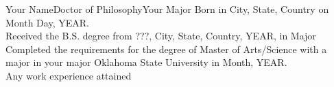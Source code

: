 \newpage
 \begin{vita}{Your Name}{Doctor of Philosophy}{Your Major} %
  Born in City, State, Country on Month Day, YEAR.             
  \\ Received the B.S. degree from ???, City, State, Country, YEAR, in Major \\
Completed the requirements for the degree of Master of Arts/Science with a major in your major Oklahoma State University in Month, YEAR.
 \\ Any work experience attained
  \end{vita}
